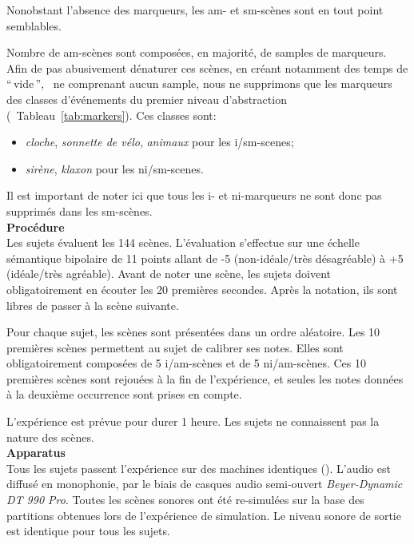 Nonobstant l'absence des marqueurs, les am- et sm-scènes sont en tout point semblables. 

Nombre de am-scènes sont composées, en majorité, de samples de marqueurs. Afin de pas abusivement dénaturer ces scènes, en créant notamment des temps de ``\,vide\,'', \ie~ne comprenant aucun sample, nous ne supprimons que les marqueurs des classes d'événements du premier niveau d'abstraction (\cf~Tableau~\ref{tab:markers}). Ces classes sont: 

\begin{itemize}
\item \emph{cloche}, \emph{sonnette de vélo}, \emph{animaux} pour les i/sm-scenes;
\item \emph{sirène}, \emph{klaxon} pour les ni/sm-scenes.
\end{itemize}
 
Il est important de noter ici que tous les i- et ni-marqueurs ne sont donc pas supprimés dans les sm-scènes. \\
 
\textbf{Procédure} \\

Les sujets évaluent les 144 scènes. L'évaluation s'effectue sur une échelle sémantique bipolaire de 11 points allant de -5 (non-idéale/très désagréable) à +5 (idéale/très agréable). Avant de noter une scène, les sujets doivent obligatoirement en écouter les 20 premières secondes. Après la notation, ils sont libres de passer à la scène suivante.

Pour chaque sujet, les scènes sont présentées dans un ordre aléatoire. Les 10 premières scènes permettent au sujet de calibrer ses notes. Elles sont obligatoirement composées de 5 i/am-scènes et de 5 ni/am-scènes. Ces 10 premières scènes sont rejouées à la fin de l'expérience, et seules les notes données à la deuxième occurrence sont prises en compte. 

L'expérience est prévue pour durer 1 heure. Les sujets ne connaissent pas la nature des scènes.\\

\textbf{Apparatus} \\

Tous les sujets passent l'expérience sur des machines identiques (). L'audio est diffusé en monophonie, par le biais de casques audio semi-ouvert \emph{Beyer-Dynamic DT 990 Pro}. Toutes les scènes sonores ont été re-simulées sur la base des partitions obtenues lors de l'expérience de simulation. Le niveau sonore de sortie est identique pour tous les sujets.


